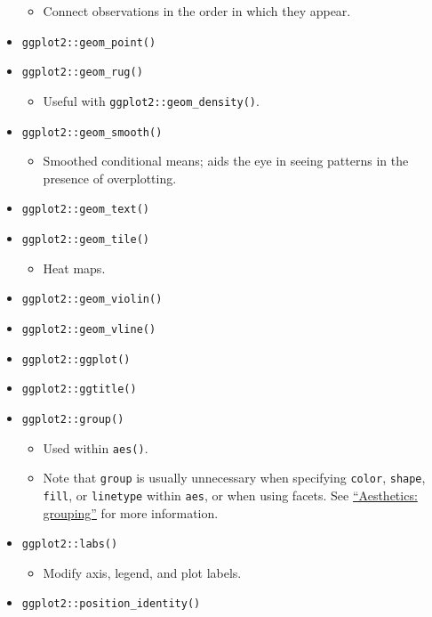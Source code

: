 \documentclass[
]{book}
\providecommand{\tightlist}{%
  \setlength{\itemsep}{0pt}\setlength{\parskip}{0pt}}
\begin{document}
\begin{itemize}
  \begin{itemize}
  \tightlist
  \item
    Connect observations in the order in which they appear.
  \end{itemize}
\item
  \texttt{ggplot2::geom\_point()}
\item
  \texttt{ggplot2::geom\_rug()}

  \begin{itemize}
  \tightlist
  \item
    Useful with \texttt{ggplot2::geom\_density()}.
  \end{itemize}
\item
  \texttt{ggplot2::geom\_smooth()}

  \begin{itemize}
  \tightlist
  \item
    Smoothed conditional means; aids the eye in seeing patterns in the presence of overplotting.
  \end{itemize}
\item
  \texttt{ggplot2::geom\_text()}
\item
  \texttt{ggplot2::geom\_tile()}

  \begin{itemize}
  \tightlist
  \item
    Heat maps.
  \end{itemize}
\item
  \texttt{ggplot2::geom\_violin()}
\item
  \texttt{ggplot2::geom\_vline()}
\item
  \texttt{ggplot2::ggplot()}
\item
  \texttt{ggplot2::ggtitle()}
\item
  \texttt{ggplot2::group()}

  \begin{itemize}
  \tightlist
  \item
    Used within \texttt{aes()}.
  \item
    Note that \texttt{group} is usually unnecessary when specifying \texttt{color}, \texttt{shape}, \texttt{fill}, or \texttt{linetype} within \texttt{aes}, or when using facets. See \href{https://ggplot2.tidyverse.org/reference/aes_group_order.html}{``Aesthetics: grouping''} for more information.
  \end{itemize}
\item
  \texttt{ggplot2::labs()}

  \begin{itemize}
  \tightlist
  \item
    Modify axis, legend, and plot labels.
  \end{itemize}
\item
  \texttt{ggplot2::position\_identity()}


\end{itemize}
\end{document}
